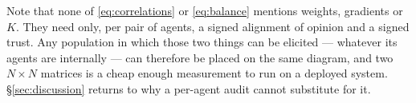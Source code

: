 Note that none of \eqref{eq:correlations} or \eqref{eq:balance} mentions weights,
gradients or $K$. They need only, per pair of agents, a signed alignment of opinion
and a signed trust. Any population in which those two things can be elicited ---
whatever its agents are internally --- can therefore be placed on the same diagram,
and two $N\times N$ matrices is a cheap enough measurement to run on a deployed
system. \S\ref{sec:discussion} returns to why a per-agent audit cannot substitute
for it.
